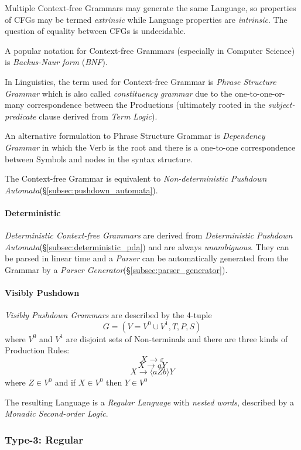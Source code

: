 \documentclass{article}
\begin{document}
Multiple Context-free Grammars may generate the same Language, so
properties of CFGs may be termed \emph{extrinsic} while Language properties
are \emph{intrinsic}. The question of equality between CFGs is
undecidable.

A popular notation for Context-free Grammars (especially in Computer
Science) is \emph{Backus-Naur form} (\emph{BNF}).

In Linguistics, the term used for Context-free Grammar is \emph{Phrase
  Structure Grammar} which is also called \emph{constituency grammar}
due to the one-to-one-or-many correspondence between the Productions
(ultimately rooted in the \emph{subject-predicate} clause derived from
\emph{Term Logic}).

An alternative formulation to Phrase Structure Grammar is \emph{Dependency
  Grammar} in which the Verb is the root and there is a one-to-one
correspondence between Symbols and nodes in the syntax structure.

The Context-free Grammar is equivalent to \emph{Non-deterministic
Pushdown Automata}(\S\ref{subsec:pushdown_automata}).

\paragraph{Deterministic}\label{subsec:deterministic_cfg}
\emph{Deterministic Context-free Grammars} are derived from
\emph{Deterministic Pushdown Automata}(\S\ref{subsec:deterministic_pda})
and are always \emph{unambiguous}. They can be parsed in linear time
and a \emph{Parser} can be automatically generated from the Grammar by a
\emph{Parser Generator}(\S\ref{subsec:parser_generator}).

\paragraph{Visibly Pushdown}
\emph{Visibly Pushdown Grammars} are described by the 4-tuple
\[
    G = (V=V^0 \cup V^1,T,P,S)
\]
where $V^0$ and $V^1$ are disjoint sets of Non-terminals and there
are three kinds of Production Rules:
\[
    X \rightarrow \varepsilon
\]\[
    X \rightarrow aY
\]\[
    X \rightarrow \langle aZb \rangle Y
\]
where $Z \in V^0$ and if $X \in V^0$ then $Y \in V^0$

The resulting Language is a \emph{Regular Language} with \emph{nested
  words}, described by a \emph{Monadic Second-order Logic}. %

\subsubsection{Type-3: Regular} \label{subsec:regular_language}
\end{document}
